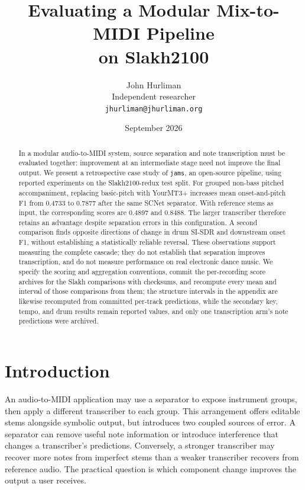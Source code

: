 \documentclass[11pt]{article}
\title{\textbf{Evaluating a Modular Mix-to-MIDI Pipeline\\on Slakh2100}}
\author{John Hurliman\\\small Independent researcher\\
\small \texttt{jhurliman@jhurliman.org}}
\date{September 2026}
\newcommand{\jams}{\texttt{jams}}
\begin{document}
\maketitle

\begin{abstract}
In a modular audio-to-MIDI system, source separation and note transcription must be
evaluated together: improvement at an intermediate stage need not improve the final
output. We present a retrospective case study of \jams{}, an open-source pipeline,
using reported experiments on the Slakh2100-redux test split. For grouped non-bass
pitched accompaniment, replacing basic-pitch with YourMT3+ increases mean
onset-and-pitch F1 from 0.4733 to 0.7877 after the same SCNet separator. With reference
stems as input, the corresponding scores are 0.4897 and 0.8488. The larger transcriber
therefore retains an advantage despite separation errors in this configuration.
A second comparison finds opposite directions of change in drum SI-SDR and
downstream onset F1, without establishing a statistically reliable reversal.
These observations support measuring the complete cascade; they do not establish
that separation improves transcription, and do not measure performance on real electronic dance music.
We specify the scoring and aggregation conventions, commit the per-recording score
archives for the Slakh comparisons with checksums, and recompute every mean and
interval of those comparisons from them; the structure intervals in the appendix
are likewise recomputed from committed per-track predictions, while the secondary
key, tempo, and drum results remain reported values, and only one transcription
arm's note predictions were archived.
\end{abstract}

\section{Introduction}
An audio-to-MIDI application may use a separator to expose instrument groups, then
apply a different transcriber to each group. This arrangement offers editable stems
alongside symbolic output, but introduces two coupled sources of error. A separator
can remove useful note information or introduce interference that changes a
transcriber's predictions. Conversely, a stronger transcriber may recover more
notes from imperfect stems than a weaker transcriber recovers from reference audio.
The practical question is which component change improves the output a user receives.
\end{document}

